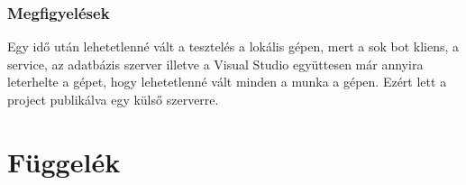 \documentclass[twoside, a4paper, 12pt]{book}
\begin{document}
\section{Megfigyelések}
Egy idő után lehetetlenné vált a tesztelés a lokális gépen, mert a sok bot kliens, a service, az adatbázis szerver illetve a Visual Studio együttesen már annyira leterhelte a gépet, hogy lehetetlenné vált minden a munka a gépen. Ezért lett a project publikálva egy külső szerverre.

















































































\newpage
\part{Függelék}
\end{document}
